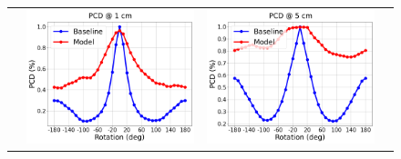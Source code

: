 \def\rot#1{\rotatebox{90}{#1}}
\begin{figure}
    \centering
    \begin{tabular}{cccc}
    \rot{~~~~~\textbf{Synthetic}} &
    \includegraphics[scale=0.13]{main/chapter04/data/plot_pcd_1_synth.png} &
    \includegraphics[scale=0.13]{main/chapter04/data/plot_pcd_5_synth.png} &

\end{tabular}
\end{figure}
